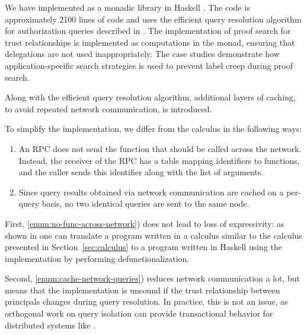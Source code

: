 We have implemented \lang{} as a monadic library in Haskell \cite{flamiolib}. The code is approximately 2100 lines of code and uses the efficient query resolution algorithm for authorization queries described in \cite{Arden:2015:FA:2859845.2859998}. The implementation of proof search for trust relationships is implemented as computations in the \lang{} monad, ensuring that delegations are not used inappropriately. The case studies demonstrate how application-specific search strategies is used to prevent label creep during proof search.

Along with the efficient query resolution algorithm, additional layers of caching, to avoid repeated network communication, is introduced. %

To simplify the implementation, we differ from the calculus in the following ways:
\begin{enumerate}
    \item \label{enum:no-func-across-network} An RPC does not send the function that should be called across the network. Instead, the receiver of the RPC has a table mapping identifiers to functions, and the caller sends this identifier along with the list of arguments.
    \item \label{enum:cache-network-queries} Since query results obtained via network communication are cached on a per-query basis, no two identical queries are sent to the same node.
\end{enumerate}

First, \ref{enum:no-func-across-network}) does not lead to loss of expressivity: as shown in \cite{Cooper:2009:RC:1599410.1599439} one can translate a program written in a calculus similar to the calculus presented in Section~\ref{sec:calculus} to a program written in Haskell using the \lang{} implementation by performing defunctionalization.

Second, \ref{enum:cache-network-queries}) reduces network communication a lot, but means that the implementation is unsound if the trust relationship between principals changes during query resolution. In practice, this is not an issue, as orthogonal work on query isolation \cite{Liu:2009:FPS:1629575.1629606} can provide transactional behavior for distributed systems like \lang.

